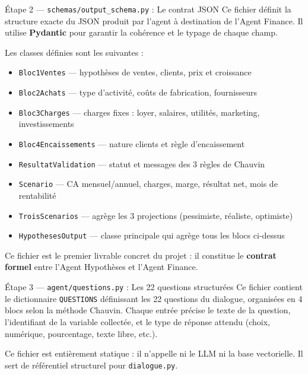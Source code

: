 \documentclass[12pt, a4paper]{report}
\begin{document}
\begin{stepbox}{Étape 2 — \texttt{schemas/output\_schema.py} : Le contrat JSON}
Ce fichier définit la structure exacte du JSON produit par l'agent à destination de l'Agent Finance. Il utilise \textbf{Pydantic} pour garantir la cohérence et le typage de chaque champ.

Les classes définies sont les suivantes :
\begin{itemize}
  \item \texttt{Bloc1Ventes} — hypothèses de ventes, clients, prix et croissance
  \item \texttt{Bloc2Achats} — type d'activité, coûts de fabrication, fournisseurs
  \item \texttt{Bloc3Charges} — charges fixes : loyer, salaires, utilités, marketing, investissements
  \item \texttt{Bloc4Encaissements} — nature clients et règle d'encaissement
  \item \texttt{ResultatValidation} — statut et messages des 3 règles de Chauvin
  \item \texttt{Scenario} — CA mensuel/annuel, charges, marge, résultat net, mois de rentabilité
  \item \texttt{TroisScenarios} — agrège les 3 projections (pessimiste, réaliste, optimiste)
  \item \texttt{HypothesesOutput} — classe principale qui agrège tous les blocs ci-dessus
\end{itemize}

Ce fichier est le premier livrable concret du projet : il constitue le \textbf{contrat formel} entre l'Agent Hypothèses et l'Agent Finance.
\end{stepbox}

\bigskip

\begin{stepbox}{Étape 3 — \texttt{agent/questions.py} : Les 22 questions structurées}
Ce fichier contient le dictionnaire \texttt{QUESTIONS} définissant les 22 questions du dialogue, organisées en 4 blocs selon la méthode Chauvin. Chaque entrée précise le texte de la question, l'identifiant de la variable collectée, et le type de réponse attendu (choix, numérique, pourcentage, texte libre, etc.).

Ce fichier est entièrement statique : il n'appelle ni le LLM ni la base vectorielle. Il sert de référentiel structurel pour \texttt{dialogue.py}.
\end{stepbox}
\end{document}

